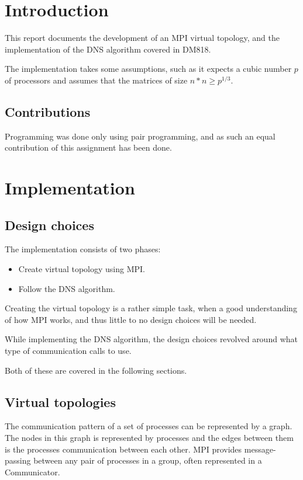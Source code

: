 \documentclass[a4paper,11pt,oneside]{book}
\begin{document}
\pagestyle{ruled}
\chapter{Introduction}
\setcounter{section}{1}
This report documents the development of an MPI virtual topology, and the implementation of the DNS algorithm covered in DM818.

The implementation takes some assumptions, such as it expects a cubic number $p$ of processors and assumes that the matrices of size $n*n \geq p^{1/3}$.

\section{Contributions}
Programming was done only using pair programming, and as such an equal contribution of this assignment has been done.

\chapter{Implementation}
\section{Design choices}
The implementation consists of two phases:
\begin{itemize}
\item Create virtual topology using MPI.
\item Follow the DNS algorithm.
\end{itemize}

Creating the virtual topology is a rather simple task, when a good understanding of how MPI works, and thus little to no design choices will be needed. 

While implementing the DNS algorithm, the design choices revolved around what type of communication calls to use.

Both of these are covered in the following sections.

\section{Virtual topologies}
The communication pattern of a set of processes can be represented by a graph. The nodes in this graph is represented by processes and the edges between them is the processes communication between each other. MPI provides message-passing between any pair of processes in a group, often represented in a Communicator.
\end{document}
